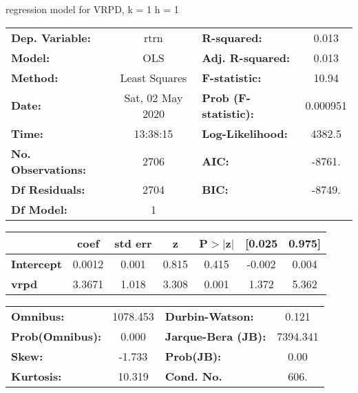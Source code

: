regression model for VRPD, k = 1 h = 1\begin{center}
\begin{tabular}{lclc}
\toprule
\textbf{Dep. Variable:}    &       rtrn       & \textbf{  R-squared:         } &     0.013   \\
\textbf{Model:}            &       OLS        & \textbf{  Adj. R-squared:    } &     0.013   \\
\textbf{Method:}           &  Least Squares   & \textbf{  F-statistic:       } &     10.94   \\
\textbf{Date:}             & Sat, 02 May 2020 & \textbf{  Prob (F-statistic):} &  0.000951   \\
\textbf{Time:}             &     13:38:15     & \textbf{  Log-Likelihood:    } &    4382.5   \\
\textbf{No. Observations:} &        2706      & \textbf{  AIC:               } &    -8761.   \\
\textbf{Df Residuals:}     &        2704      & \textbf{  BIC:               } &    -8749.   \\
\textbf{Df Model:}         &           1      & \textbf{                     } &             \\
\bottomrule
\end{tabular}
\begin{tabular}{lcccccc}
                   & \textbf{coef} & \textbf{std err} & \textbf{z} & \textbf{P$> |$z$|$} & \textbf{[0.025} & \textbf{0.975]}  \\
\midrule
\textbf{Intercept} &       0.0012  &        0.001     &     0.815  &         0.415        &       -0.002    &        0.004     \\
\textbf{vrpd}      &       3.3671  &        1.018     &     3.308  &         0.001        &        1.372    &        5.362     \\
\bottomrule
\end{tabular}
\begin{tabular}{lclc}
\textbf{Omnibus:}       & 1078.453 & \textbf{  Durbin-Watson:     } &    0.121  \\
\textbf{Prob(Omnibus):} &   0.000  & \textbf{  Jarque-Bera (JB):  } & 7394.341  \\
\textbf{Skew:}          &  -1.733  & \textbf{  Prob(JB):          } &     0.00  \\
\textbf{Kurtosis:}      &  10.319  & \textbf{  Cond. No.          } &     606.  \\
\bottomrule
\end{tabular}
\end{center}

